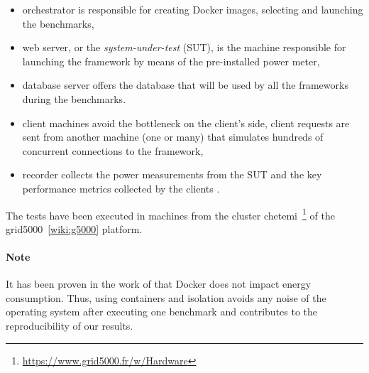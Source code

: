 \begin{itemize}
    \item \textsf{orchestrator} is responsible for creating Docker images, selecting and launching the benchmarks,
    \item \textsf{web server}, or the \emph{system-under-test} (SUT), is the machine responsible for launching the framework by means of the pre-installed power meter,
    \item \textsf{database server} offers the database that will be used by all the frameworks during the benchmarks.
    \item \textsf{client machines} avoid the bottleneck on the client's side, client requests are sent from another machine (one or many) that simulates hundreds of concurrent connections to the framework,
    \item \textsf{recorder} collects the power measurements from the SUT and the key performance metrics collected by the clients .
\end{itemize}

The tests have been executed in machines from the cluster \textsf{chetemi}~\footnote{\url{https://www.grid5000.fr/w/Hardware}} of the grid5000~\ref{wiki:g5000} platform.


\paragraph{Note}
It has been proven in the work of \citeauthor{eddie_antonio_santos_how} that Docker does not impact energy consumption.
Thus, using containers and isolation avoids any noise of the operating system after executing one benchmark and contributes to the reproducibility of our results.

